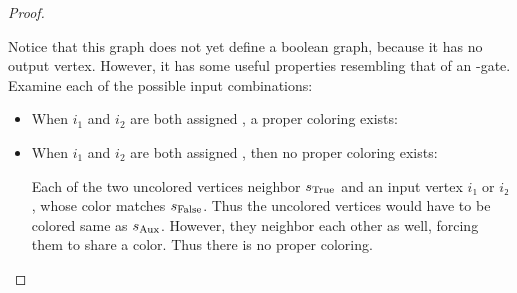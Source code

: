 \documentclass{report-snippet}
\begin{document}
\begin{proof}
\begin{description}
\begin{aside}
      Notice that this graph does not yet define a boolean graph, because it has
      no output vertex.  However, it has some useful properties resembling that
      of an \OR-gate.  Examine each of the possible input combinations:
      \begin{itemize}
        \item When \(i_1\) and \(i_2\) are both assigned \True, a proper
          coloring exists:
          \begin{center}
          \end{center}

        \item When \(i_1\) and \(i_2\) are both assigned \False, then no proper
          coloring exists:
          \begin{center}
          \end{center}

          Each of the two uncolored vertices neighbor \(s_{\mathrm{True}}\) and an input
          vertex \(i₁\) or \(i₂\), whose color matches \(s_{\mathrm{False}}\).  Thus the
          uncolored vertices would have to be colored same as \(s_{\mathrm{Aux}}\).
          However, they neighbor each other as well, forcing them to share a
          color.  Thus there is no proper coloring.


\end{itemize}
\end{aside}
\end{description}
\end{proof}
\end{document}
